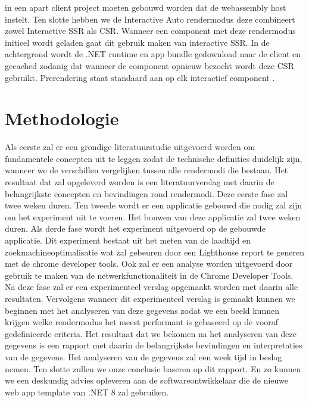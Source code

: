 \documentclass{hogent-article}
\begin{document}
in een apart client project moeten gebouwd worden dat de webassembly host instelt. \autocite{Guardrex2023a} Ten slotte hebben we de Interactive Auto rendermodus deze combineert zowel Interactive SSR als CSR. Wanneer een component met deze rendermodus
initieel wordt geladen gaat dit gebruik maken van interactive SSR. In de achtergrond wordt de .NET runtime en app bundle gedownload naar de client en gecached zodanig dat wanneer de component opnieuw bezocht wordt deze
CSR gebruikt. \autocite{Guardrex2023a} Prerendering staat standaard aan op elk interactief component \autocite{Guardrex2023a}. 


\section{Methodologie}%
\label{sec:methodologie}

Als eerste zal er een grondige literatuurstudie uitgevoerd worden om fundamentele concepten uit te leggen zodat de technische definities duidelijk zijn, wanneer we de verschillen vergelijken tussen alle rendermodi die bestaan. Het resultaat dat zal opgeleverd worden is een
literatuurverslag met daarin de belangrijkste concepten en bevindingen rond rendermodi. Deze eerste fase zal twee weken duren. Ten tweede wordt er een applicatie gebouwd die nodig zal zijn om het experiment uit te voeren.
Het bouwen van deze applicatie zal twee weken duren. Als derde fase wordt het experiment uitgevoerd op de gebouwde applicatie. Dit experiment bestaat uit het meten van de laadtijd en zoekmachineoptimalisatie wat zal gebeuren door een Lighthouse
report te generen met de chrome developer tools. Ook zal er een analyse worden uitgevoerd door gebruik te maken van de netwerkfunctionaliteit in de Chrome Developer Tools. Na deze fase zal er een experimenteel verslag opgemaakt worden met daarin alle resultaten.
Vervolgens wanneer dit experimenteel verslag is gemaakt kunnen we beginnen met het analyseren van deze gegevens zodat we een beeld kunnen krijgen welke rendermodus het meest performant is gebaseerd op de vooraf gedefinieerde
criteria. Het resultaat dat we bekomen na het analyseren van deze gegevens is een rapport met daarin de belangrijkste bevindingen en interpretaties van de gegevens. Het analyseren van de gegevens zal een week tijd in beslag nemen.
Ten slotte zullen we onze conclusie baseren op dit rapport. En zo kunnen we een deskundig advies opleveren aan de softwareontwikkelaar die de nieuwe web app template van .NET 8 zal gebruiken.
\end{document}
